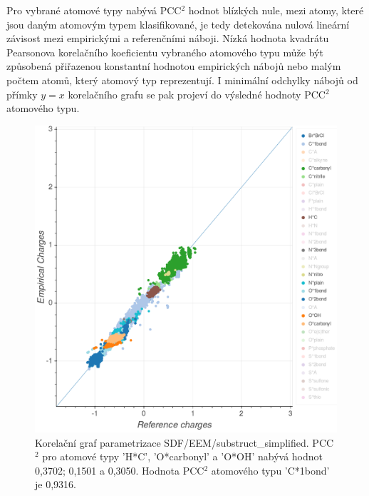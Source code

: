 Pro vybrané atomové typy nabývá PCC$^2$ hodnot blízkých nule, mezi atomy, které jsou daným atomovým typem klasifikované, je tedy detekována nulová lineární závisost mezi empirickými a referenčními náboji. Nízká hodnota kvadrátu Pearsonova korelačního koeficientu vybraného atomového typu může být způsobená přiřazenou konstantní hodnotou empirických nábojů nebo malým počtem atomů, který atomový typ reprezentují. I minimální odchylky nábojů od přímky $y = x$ korelačního grafu se pak projeví do výsledné hodnoty PCC$^2$ atomového typu.
\vspace{0,5cm}
\begin{figure}[h]
\begin{center}
\includegraphics[width=14cm]{pictures/graph_pcc_atom_types.png}
\caption{Korelační graf parametrizace SDF/EEM/substruct\_simplified. PCC$^2$ pro atomové typy 'H*C', 'O*carbonyl' a 'O*OH' nabývá hodnot 0,3702; 0,1501 a 0,3050. Hodnota PCC$^2$ atomového typu 'C*1bond' je 0,9316.}
\label{graph_pcc_atom_types}
\end{center}
\end{figure}

